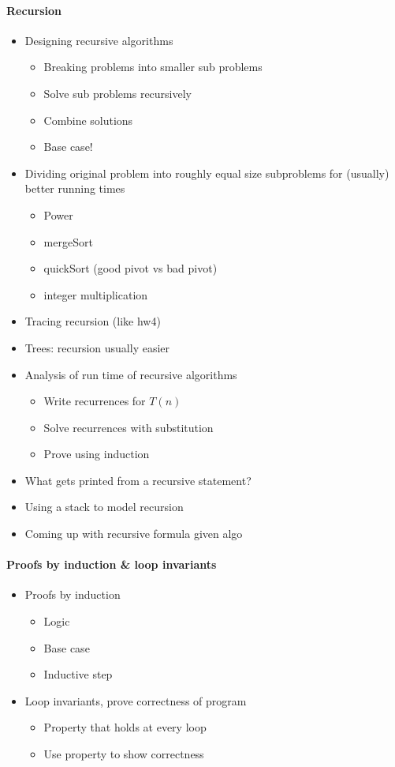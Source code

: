 \documentclass[12 pt]{article}
\theoremstyle{definition}
\begin{document}
\paragraph{Recursion}
\begin{itemize}
\item Designing recursive algorithms
  \begin{itemize}
  \item Breaking problems into smaller sub problems
  \item Solve sub problems recursively
  \item Combine solutions
  \item Base case!
  \end{itemize}
\item Dividing original problem into roughly equal size subproblems for (usually) better running times
  \begin{itemize}
  \item Power
  \item mergeSort
  \item quickSort (good pivot vs bad pivot)
  \item integer multiplication
  \end{itemize}
\item Tracing recursion (like hw4)
\item Trees: recursion usually easier
\item Analysis of run time of recursive algorithms
  \begin{itemize}
  \item Write recurrences for $T(n)$
  \item Solve recurrences with substitution
  \item Prove using induction
  \end{itemize}
\item What gets printed from a recursive statement?
\item Using a stack to model recursion
\item Coming up with recursive formula given algo
\end{itemize}
\paragraph{Proofs by induction \& loop invariants}
\begin{itemize}
\item Proofs by induction
  \begin{itemize}
  \item Logic
  \item Base case
  \item Inductive step
  \end{itemize}
\item Loop invariants, prove correctness of program
  \begin{itemize}
  \item Property that holds at every loop
  \item Use property to show correctness
  \end{itemize}
\end{itemize}
\end{document}
